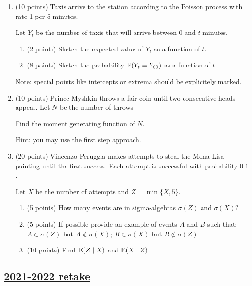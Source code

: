 \begin{enumerate}
\item (10 points) Taxis arrive to the station according to the Poisson process with rate 1 per 5 minutes. 

Let $Y_t$ be the number of taxis that will arrive between 0 and $t$ minutes.

\begin{enumerate}
  \item (2 points) Sketch the expected value of $Y_t$ as a function of $t$.
  \item (8 points) Sketch the probability $\P(Y_t = Y_{60})$ as a function of $t$.
\end{enumerate}

Note: special points like intercepts or extrema should be explicitely marked.

\item (10 points) Prince Myshkin throws a fair coin until two consecutive heads appear. 
Let $N$ be the number of throws. 

Find the moment generating function of $N$. 

Hint: you may use the first step approach.

\item (20 points) Vincenzo Peruggia makes attempts to steal the Mona Lisa painting until the first 
success. 
Each attempt is successful with probability $0.1$.

Let $X$ be the number of attempts and $Z = \min\{X, 5\}$.

\begin{enumerate}
  \item (5 points) How many events are in sigma-algebras $\sigma(Z)$ and $\sigma(X)$?
  \item (5 points) If possible provide an example of events $A$ and $B$ such that: $A\in \sigma(Z)$ but $A\not\in\sigma(X)$; $B\in \sigma(X)$ but $B\not\in\sigma(Z)$.
  \item (10 points) Find $\E(Z \mid X)$ and $\E(X \mid Z)$.
\end{enumerate}






\end{enumerate}



\subsection[2021-2022 retake]{\hyperref[sec:sol_kr_01_2021_2022_retake]{2021-2022 retake}}
\label{sec:kr_01_2021_2022_retake} %


